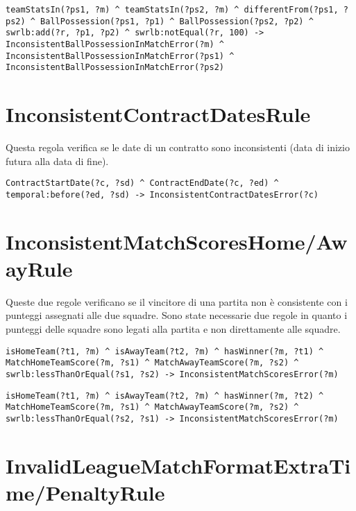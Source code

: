 \documentclass[11pt]{report} %
\begin{document}
\begin{lstlisting}[language=SWRL]
teamStatsIn(?ps1, ?m) ^ teamStatsIn(?ps2, ?m) ^ differentFrom(?ps1, ?ps2) ^ BallPossession(?ps1, ?p1) ^ BallPossession(?ps2, ?p2) ^ swrlb:add(?r, ?p1, ?p2) ^ swrlb:notEqual(?r, 100) -> InconsistentBallPossessionInMatchError(?m) ^ InconsistentBallPossessionInMatchError(?ps1) ^ InconsistentBallPossessionInMatchError(?ps2)
\end{lstlisting}

\section{InconsistentContractDatesRule}

Questa regola verifica se le date di un contratto sono inconsistenti (data di inizio futura alla data di fine).

\begin{lstlisting}[language=SWRL]
ContractStartDate(?c, ?sd) ^ ContractEndDate(?c, ?ed) ^ temporal:before(?ed, ?sd) -> InconsistentContractDatesError(?c)
\end{lstlisting}

\section{InconsistentMatchScoresHome/AwayRule}

Queste due regole verificano se il vincitore di una partita non è consistente con i punteggi assegnati alle due squadre.
Sono state necessarie due regole in quanto i punteggi delle squadre sono legati alla partita e non direttamente alle squadre.

\begin{lstlisting}[language=SWRL]
isHomeTeam(?t1, ?m) ^ isAwayTeam(?t2, ?m) ^ hasWinner(?m, ?t1) ^ MatchHomeTeamScore(?m, ?s1) ^ MatchAwayTeamScore(?m, ?s2) ^ swrlb:lessThanOrEqual(?s1, ?s2) -> InconsistentMatchScoresError(?m)
\end{lstlisting}

\begin{lstlisting}[language=SWRL]
isHomeTeam(?t1, ?m) ^ isAwayTeam(?t2, ?m) ^ hasWinner(?m, ?t2) ^ MatchHomeTeamScore(?m, ?s1) ^ MatchAwayTeamScore(?m, ?s2) ^ swrlb:lessThanOrEqual(?s2, ?s1) -> InconsistentMatchScoresError(?m)
\end{lstlisting}

\section{InvalidLeagueMatchFormatExtraTime/PenaltyRule}
\end{document}
